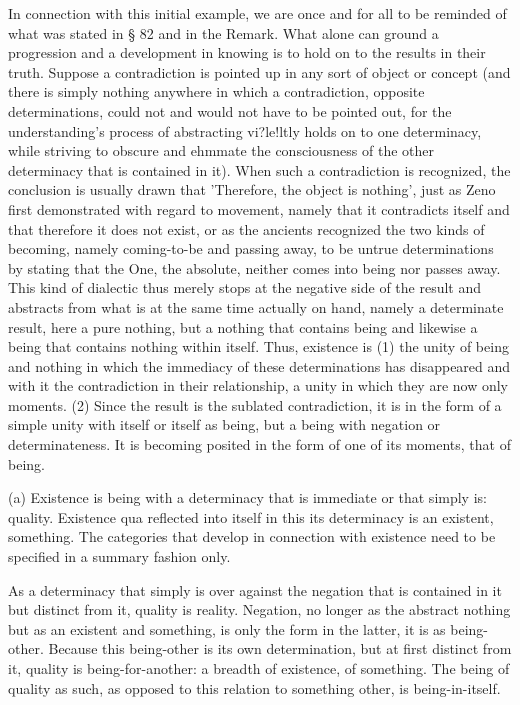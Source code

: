 In connection with this initial example,
we are once and for all to be reminded
of what was stated in § 82 and in the Remark.
What alone can ground a progression and
a development in knowing is
to hold on to the results in their truth.
Suppose a contradiction is pointed up
in any sort of object or concept
(and there is simply nothing anywhere in which a contradiction,
opposite determinations, could not and would not have to be
pointed out, for the understanding's process of abstracting vi?le!ltly
holds on to one determinacy, while striving to obscure and ehmmate
the consciousness of the other determinacy that is contained in it).
When such a contradiction is recognized,
the conclusion is usually drawn that
'Therefore, the object is nothing',
just as Zeno first demonstrated with regard to movement,
namely that it contradicts itself
and that therefore it does not exist,
or as the ancients recognized the two kinds of becoming,
namely coming-to-be and passing away,
to be untrue determinations by stating that the One,
the absolute, neither comes into being nor passes away.
This kind of dialectic thus merely stops
at the negative side of the result
and abstracts from what is at the same time
actually on hand, namely a determinate result,
here a pure nothing, but a nothing that contains being
and likewise a being that contains nothing within itself.
Thus, existence is
(1) the unity of being and nothing
in which the immediacy of these determinations has disappeared
and with it the contradiction in their relationship,
a unity in which they are now only moments.
(2) Since the result is the sublated contradiction,
it is in the form of a simple unity with itself
or itself as being, but a being with negation or determinateness.
It is becoming posited in the form of one of its moments,
that of being.

(a) Existence is being with a determinacy
that is immediate or that simply is: quality.
Existence qua reflected into itself in this
its determinacy is an existent, something.
The categories that develop in connection with existence
need to be specified in a summary fashion only.

As a determinacy that simply is over against the negation
that is contained in it but distinct from it,
quality is reality.
Negation, no longer as the abstract nothing
but as an existent and something, is
only the form in the latter, it is as being-other.
Because this being-other is its own determination,
but at first distinct from it,
quality is being-for-another: a breadth of existence, of something.
The being of quality as such,
as opposed to this relation to something other,
is being-in-itself.

